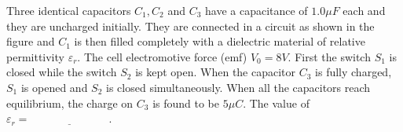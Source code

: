 
\item Three identical capacitors \( C_1, C_2 \) and \( C_3 \) have a capacitance of \( 1.0 \mu F \) each and they are uncharged initially. They are connected in a circuit as shown in the figure and \( C_1 \) is then filled completely with a dielectric material of relative permittivity \( \varepsilon_r \). The cell electromotive force (emf) \( V_0 = 8 V \). First the switch \( S_1 \) is closed while the switch \( S_2 \) is kept open. When the capacitor \( C_3 \) is fully charged, \( S_1 \) is opened and \( S_2 \) is closed simultaneously. When all the capacitors reach equilibrium, the charge on \( C_3 \) is found to be \( 5 \mu C \). The value of \( \varepsilon_r = \underline{\hspace{3cm}} \).
\begin{center}
\end{center}

